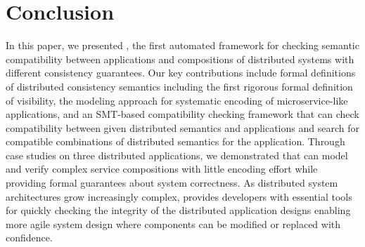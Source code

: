\section{Conclusion}

In this paper, we presented \sysname{}, the first automated framework for checking semantic compatibility between applications and compositions of distributed systems with different consistency guarantees.  Our key contributions include formal definitions of distributed consistency semantics including the first rigorous formal definition of visibility, the \sysgraph{} modeling approach for systematic encoding of microservice-like applications, and an SMT-based compatibility checking framework that can check compatibility between given distributed semantics and applications and search for compatible combinations of distributed semantics for the application. Through case studies on three distributed applications, we demonstrated that \sysname{} can model and verify complex service compositions with little encoding effort while providing formal guarantees about system correctness.  As distributed system architectures grow increasingly complex, \sysname{} provides developers with essential tools for quickly checking the integrity of the distributed application designs enabling more agile system design where components can be modified or replaced with confidence.
